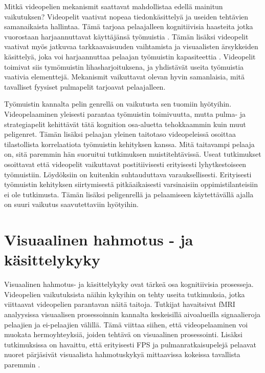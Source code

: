 \documentclass[utf8,bachelor]{gradu3}
\begin{document}
Mitkä videopelien mekanismit saattavat mahdollistaa edellä mainitun vaikutuksen? Videopelit vaativat nopeaa tiedonkäsittelyä ja useiden tehtävien samanaikaista hallintaa. Tämä tarjoaa pelaajalleen kognitiivisia haasteita jotka vuorostaan harjaannuttavat käyttäjänsä työmuistia \parencite{choudhury2022cognitive}. Tämän lisäksi videopelit vaativat myös jatkuvaa tarkkaavaisuuden vaihtamista ja visuaalisten ärsykkeiden käsittelyä, joka voi harjaannuttaa pelaajan työmuistin kapasiteettia \parencite{jamanetworkopen}. Videopelit toimivat siis tymömuistin lihasharjoituksena, ja yhdistävät useita työmuistia vaativia elementtejä. Mekanismit vaikuttavat olevan hyvin samanlaisia, mitä tavalliset fyysiset pulmapelit tarjoavat pelaajalleen.  

Työmuistin kannalta pelin genrellä on vaikutusta sen tuomiin hyötyihin. Videopelaaminen yleisesti parantaa työmuistin toimivuutta, mutta pulma- ja strategiapelit kehittävät tätä kognition osa-aluetta tehokkaammin kuin muut peligenret.  Tämän lisäksi pelaajan yleinen taitotaso videopeleissä osoittaa tilastollista korrelaatiota työmuistin kehityksen kanssa. Mitä taitavampi pelaaja on, sitä paremmin hän suoruitui tutkimuksen muistitehtävissä. \parencite {zioga2024validation} Useat tutkimukset osoittavat että videopelit vaikuttavat postitiivisesti erityisesti lyhytkestoiseen työmuistiin. Löydöksiin on kuitenkin suhtauduttava varauksellisesti. Erityisesti työmuistin kehityksen siirtymisestä pitkäaikaisesti varsinaisiin oppimistilanteisiin ei ole tutkimusta. Tämän lisäksi peligenrellä ja pelaamiseen käytettävällä ajalla on suuri vaikutus saavutettaviin hyötyihin.  

\section{Visuaalinen hahmotus - ja käsittelykyky}

Visuaalinen hahmotus- ja käsittelykyky ovat tärkeä osa kognitiivisia prosesseja. Videopelien vaikutuksista näihin kykyihin on tehty useita tutkimuksia, jotka viittaavat videopelien parantavan näitä taitoja. Tutkijat \textcite{jamanetworkopen} havaitsivat fMRI analyysissa visuaalisen prosessoinnin kannalta keskeisillä aivoalueilla signaalieroja pelaajien ja ei-pelaajien välillä. Tämä viittaa siihen, että videopelaaminen voi muokata hermoyhteyksiä, joiden tehtävä on visuaalinen prosessointi. Lisäksi tutkimuksissa on havaittu, että erityisesti FPS ja pulmanratkaisupelejä pelaavat nuoret pärjäsivät visuaalista hahmotuskykyä mittaavissa kokeissa tavallista paremmin \parencite{zioga2024validation}.  
\end{document}

